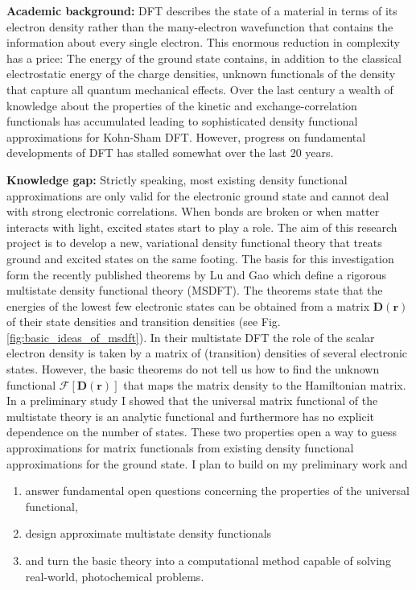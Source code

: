 \documentclass[12pt]{article}
\newcommand\m[1]{\mathbf{#1}}
\renewcommand\vec[1]{\mathbf{#1}}
\begin{document}
\noindent\textbf{Academic background:} DFT describes the state of a material in terms of its electron density rather than the many-electron wavefunction that contains the information about every single electron. This enormous reduction in complexity has a price: The energy of the ground state contains, in addition to the classical electrostatic energy of the charge densities, unknown functionals of the density that capture all quantum mechanical effects.
Over the last century a wealth of knowledge about the properties of the kinetic and exchange-correlation functionals has accumulated leading to sophisticated density functional approximations for Kohn-Sham DFT. However, progress on fundamental developments of DFT has stalled somewhat over the last 20 years.

\noindent\textbf{Knowledge gap:} Strictly speaking, most existing density functional approximations are only valid for the electronic ground state and cannot deal with strong electronic correlations. When bonds are broken or when matter interacts with light, excited states start to play a role. The aim of this research project is to develop a new, variational density functional theory that treats ground and excited states on the same footing. The basis for this investigation form the recently published theorems by Lu and Gao \cite{Lu2022JPCL} which define a rigorous multistate density functional theory (MSDFT). The theorems state that the energies of the lowest few electronic states can be obtained from a matrix $\m{D}(\vec{r})$ of their state densities and transition densities (see Fig.\ref{fig:basic_ideas_of_msdft}). In their multistate DFT the role of the scalar electron density is taken by a matrix of (transition) densities of several electronic states. However, the basic theorems do not tell us how to find the unknown functional $\m{\mathcal{F}}[\m{D}(\vec{r})]$ that maps the matrix density to the Hamiltonian matrix. In a preliminary study \cite{Humeniuk2024} I showed that the universal matrix functional of the multistate theory is an analytic functional and furthermore has no explicit dependence on the number of states. These two properties open a way to guess approximations for matrix functionals from existing density functional approximations for the ground state. I plan to build on my preliminary work \cite{Humeniuk2024} and

\begin{enumerate}[label=(\Alph*)]
\item answer fundamental open questions concerning the properties of the universal functional,
\item design approximate multistate density functionals
\item and turn the basic theory into a computational method capable of solving real-world, photochemical problems.
\end{enumerate}
\end{document}
